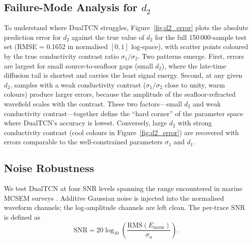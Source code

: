 \documentclass[journal]{IEEEtran}
\begin{document}
\subsection{Failure-Mode Analysis for $d_2$}
\label{sec:failure}

To understand where DualTCN struggles, Figure~\ref{fig:d2_error}
plots the absolute prediction error for $d_2$ against the true value
of $d_2$ for the full 150\,000-sample test set (RMSE = 0.1652 in
normalised $[0,1]$ log-space), with scatter points coloured by the
true conductivity contrast ratio $\sigma_1 / \sigma_2$.  Two
patterns emerge.  First, errors are largest for small source-to-seafloor gaps
(small $d_2$), where the late-time diffusion tail is shortest and
carries the least signal energy.  Second, at any given $d_2$,
samples with a weak conductivity contrast ($\sigma_1 / \sigma_2$
close to unity, warm colours) produce larger errors, because the
amplitude of the seafloor-refracted wavefield scales with the
contrast.  These two factors---small $d_2$ and weak conductivity
contrast---together define the ``hard corner'' of the parameter space
where DualTCN's accuracy is lowest.  Conversely, large $d_2$ with
strong conductivity contrast (cool colours in Figure~\ref{fig:d2_error})
are recovered with errors comparable to the well-constrained
parameters $\sigma_1$ and $d_1$.


\subsection{Noise Robustness}
\label{sec:noise}

We test DualTCN at four SNR levels spanning the range encountered in
marine MCSEM surveys \citep{constable2010ten, key2012marine}.
Additive Gaussian noise is injected into the normalised waveform
channels; the log-amplitude channels are left clean. The per-trace
SNR is defined as
\begin{equation}
  \mathrm{SNR} = 20\log_{10}\!\left(
    \frac{\mathrm{RMS}(E_\mathrm{norm})}{\sigma_n}
  \right).
  \label{eq:snr}
\end{equation}
\end{document}
